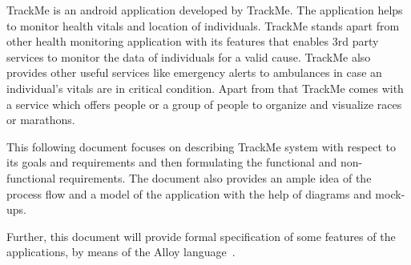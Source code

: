 TrackMe is an android application developed by TrackMe. The application helps to monitor health vitals and location of individuals. TrackMe stands apart from other health monitoring application with its features that enables 3rd party services to monitor the data of individuals for a valid cause. TrackMe also provides other useful services like emergency alerts to ambulances in case an individual's vitals are in critical condition. Apart from that TrackMe comes with a service which offers people or a group of people to organize and visualize races or marathons. 

This following document focuses on describing TrackMe system with respect to its goals and requirements and then formulating the functional and non-functional requirements. The document also provides an ample idea of the process flow and a model of the application with the help of  diagrams and mock-ups.

Further, this document will provide formal specification of some features of the applications, by means of the Alloy language~\cite{alloy-site}.
